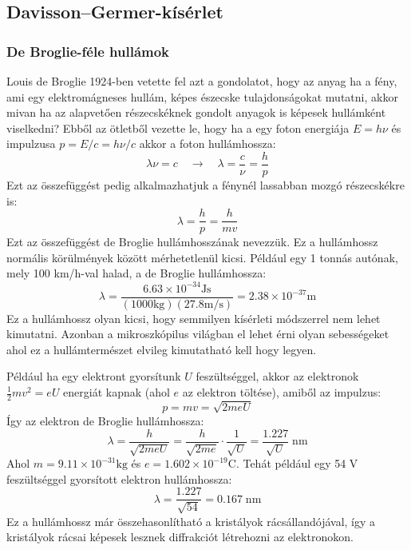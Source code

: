 \documentclass[a4paper,12pt]{article}
\begin{document}
\subsection{Davisson–Germer-kísérlet}
\subsubsection{De Broglie-féle hullámok}
Louis de Broglie 1924-ben vetette fel azt a gondolatot, hogy az anyag ha a fény, ami egy elektromágneses hullám, képes észecske tulajdonságokat mutatni, akkor mivan ha az alapvetően részecskéknek gondolt
anyagok is képesek hullámként viselkedni? Ebből az ötletből vezette le, hogy ha a egy foton energiája $E=h\nu$ és impulzusa $p=E/c=h\nu/c$ akkor a foton hullámhossza:
\begin{equation}
\lambda \nu = c \quad \rightarrow \quad \lambda = \frac{c}{\nu} = \frac{h}{p}
\end{equation}
Ezt az összefüggést pedig alkalmazhatjuk a fénynél lassabban mozgó részecskékre is:
\begin{equation}
\lambda = \frac{h}{p} = \frac{h}{mv}
\end{equation}
Ezt az összefüggést de Broglie hullámhosszának nevezzük. Ez a hullámhossz normális körülmények között mérhetetlenül kicsi. Például egy 1 tonnás autónak, mely 100 km/h-val halad, a de Broglie hullámhossza:
\begin{equation}
\lambda = \frac{6.63 \times 10^{-34} \mathrm{Js}}{(1000 \mathrm{kg})(27.8 \mathrm{m/s})} = 2.38 \times 10^{-37} \mathrm{m}
\end{equation}
Ez a hullámhossz olyan kicsi, hogy semmilyen kísérleti módszerrel nem lehet kimutatni. Azonban a mikroszkópilus világban el lehet érni olyan sebességeket ahol ez a hullámtermészet elvileg
kimutatható kell hogy legyen.

Például ha egy elektront gyorsítunk $U$ feszültséggel, akkor az elektronok $\frac{1}{2}mv^2 = eU$ energiát kapnak (ahol $e$ az elektron töltése), amiből az impulzus:
\begin{equation}
p = mv = \sqrt{2meU}
\end{equation}
Így az elektron de Broglie hullámhossza:
\begin{equation}
\lambda = \frac{h}{\sqrt{2meU}} = \frac{h}{\sqrt{2me}} \cdot \frac{1}{\sqrt{U}} = \frac{1.227}{\sqrt{U}} \; \mathrm{nm}
\end{equation}
Ahol $m = 9.11 \times 10^{-31} \mathrm{kg}$ és $e = 1.602 \times 10^{-19} \mathrm{C}$. Tehát például egy 54 V feszültséggel gyorsított elektron hullámhossza:
\begin{equation}
\lambda = \frac{1.227}{\sqrt{54}} = 0.167 \; \mathrm{nm}
\end{equation}
Ez a hullámhossz már összehasonlítható a kristályok rácsállandójával, így a kristályok rácsai képesek lesznek diffrakciót létrehozni az elektronokon.
\end{document}
